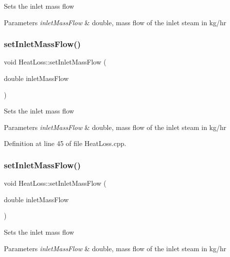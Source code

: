 Sets the inlet mass flow 
\begin{DoxyParams}{Parameters}
{\em inlet\+Mass\+Flow} & double, mass flow of the inlet steam in kg/hr \\
\hline
\end{DoxyParams}
\mbox{\label{class_heat_loss_ac4154dc9922b6ddf3f2e7a10cc64c61f}} 
\subsubsection{\texorpdfstring{set\+Inlet\+Mass\+Flow()}{setInletMassFlow()}\hspace{0.1cm}{\footnotesize\ttfamily [2/3]}}
{\footnotesize\ttfamily void Heat\+Loss\+::set\+Inlet\+Mass\+Flow (\begin{DoxyParamCaption}\item[{double}]{inlet\+Mass\+Flow }\end{DoxyParamCaption})}

Sets the inlet mass flow 
\begin{DoxyParams}{Parameters}
{\em inlet\+Mass\+Flow} & double, mass flow of the inlet steam in kg/hr \\
\hline
\end{DoxyParams}


Definition at line 45 of file Heat\+Loss.\+cpp.

\mbox{\label{class_heat_loss_ac4154dc9922b6ddf3f2e7a10cc64c61f}} 
\subsubsection{\texorpdfstring{set\+Inlet\+Mass\+Flow()}{setInletMassFlow()}\hspace{0.1cm}{\footnotesize\ttfamily [3/3]}}
{\footnotesize\ttfamily void Heat\+Loss\+::set\+Inlet\+Mass\+Flow (\begin{DoxyParamCaption}\item[{double}]{inlet\+Mass\+Flow }\end{DoxyParamCaption})}

Sets the inlet mass flow 
\begin{DoxyParams}{Parameters}
{\em inlet\+Mass\+Flow} & double, mass flow of the inlet steam in kg/hr \\
\hline
\end{DoxyParams}
\mbox{\label{class_heat_loss_ab0a6b1f2a964d161d25758318f25f7e3}} 
